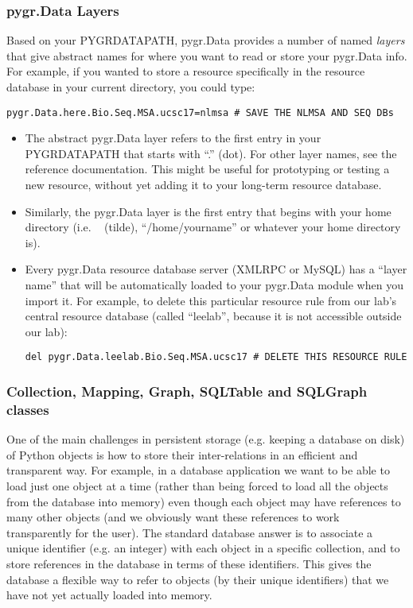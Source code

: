 \documentclass{howto}
\begin{document}
\subsubsection{pygr.Data Layers}
Based on your PYGRDATAPATH, pygr.Data provides a number of named {\em layers}
that give abstract names for where you want to read or store your pygr.Data info.
For example, if you wanted to store a resource specifically in the resource
database in your current directory, you could type:
\begin{verbatim}
pygr.Data.here.Bio.Seq.MSA.ucsc17=nlmsa # SAVE THE NLMSA AND SEQ DBs
\end{verbatim}
\begin{itemize}
\item The abstract pygr.Data layer  refers to the first entry in your
PYGRDATAPATH that starts with ``.'' (dot).  For other layer names, see
the reference documentation.  This might be useful for prototyping or
testing a new resource, without yet adding it to your long-term resource
database.

\item Similarly, the pygr.Data layer
 is the first entry that begins with your home directory
(i.e. ~ (tilde), ``/home/yourname'' or whatever your home directory is).

\item Every pygr.Data resource database server (XMLRPC or MySQL) has
a ``layer name'' that will be automatically loaded to your pygr.Data module
when you import it.  For example, to delete this particular resource rule
from our lab's central resource database (called ``leelab'', because it is
not accessible outside our lab):
\begin{verbatim}
del pygr.Data.leelab.Bio.Seq.MSA.ucsc17 # DELETE THIS RESOURCE RULE
\end{verbatim}
\end{itemize}


\subsubsection{Collection, Mapping, Graph, SQLTable and SQLGraph classes}
One of the main challenges in persistent storage (e.g. keeping a database
on disk) of Python objects is how to store their inter-relations
in an efficient and transparent way.  For example, in a database
application we want to be able to load just one object at a time
(rather than being forced to load all the objects from the database into memory)
even though each object may have references to many other objects
(and we obviously want these references to work transparently for the
user).  The standard database answer is to associate a unique identifier
(e.g. an integer) with each object in a specific collection, and
to store references in the database in terms of these identifiers.
This gives the database a flexible way to refer to objects (by their unique
identifiers) that we have not yet actually loaded into memory.  
\end{document}
